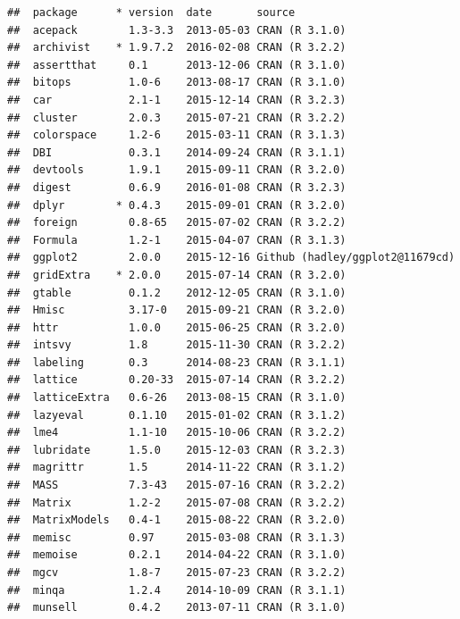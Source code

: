 \documentclass[nojss]{jss}\usepackage[]{graphicx}\usepackage[]{color}
\makeatletter
\newenvironment{kframe}{%
 \def\at@end@of@kframe{}%
 \ifinner\ifhmode%
  \def\at@end@of@kframe{\end{minipage}}%
  \begin{minipage}{\columnwidth}%
 \fi\fi%
 \def\FrameCommand##1{\hskip\@totalleftmargin \hskip-\fboxsep
 \colorbox{shadecolor}{##1}\hskip-\fboxsep
     \hskip-\linewidth \hskip-\@totalleftmargin \hskip\columnwidth}%
 \MakeFramed {\advance\hsize-\width
   \@totalleftmargin\z@ \linewidth\hsize
   \@setminipage}}%
 {\par\unskip\endMakeFramed%
 \at@end@of@kframe}
\newenvironment{knitrout}{}{} %
\makeatother
\begin{document}
\begin{knitrout}
\begin{kframe}
{\ttfamily\noindent\itshape\color{messagecolor}{\#\# Packages -------------------------------------------------------------}}\begin{verbatim}
##  package      * version  date       source                         
##  acepack        1.3-3.3  2013-05-03 CRAN (R 3.1.0)                 
##  archivist    * 1.9.7.2  2016-02-08 CRAN (R 3.2.2)                 
##  assertthat     0.1      2013-12-06 CRAN (R 3.1.0)                 
##  bitops         1.0-6    2013-08-17 CRAN (R 3.1.0)                 
##  car            2.1-1    2015-12-14 CRAN (R 3.2.3)                 
##  cluster        2.0.3    2015-07-21 CRAN (R 3.2.2)                 
##  colorspace     1.2-6    2015-03-11 CRAN (R 3.1.3)                 
##  DBI            0.3.1    2014-09-24 CRAN (R 3.1.1)                 
##  devtools       1.9.1    2015-09-11 CRAN (R 3.2.0)                 
##  digest         0.6.9    2016-01-08 CRAN (R 3.2.3)                 
##  dplyr        * 0.4.3    2015-09-01 CRAN (R 3.2.0)                 
##  foreign        0.8-65   2015-07-02 CRAN (R 3.2.2)                 
##  Formula        1.2-1    2015-04-07 CRAN (R 3.1.3)                 
##  ggplot2        2.0.0    2015-12-16 Github (hadley/ggplot2@11679cd)
##  gridExtra    * 2.0.0    2015-07-14 CRAN (R 3.2.0)                 
##  gtable         0.1.2    2012-12-05 CRAN (R 3.1.0)                 
##  Hmisc          3.17-0   2015-09-21 CRAN (R 3.2.0)                 
##  httr           1.0.0    2015-06-25 CRAN (R 3.2.0)                 
##  intsvy         1.8      2015-11-30 CRAN (R 3.2.2)                 
##  labeling       0.3      2014-08-23 CRAN (R 3.1.1)                 
##  lattice        0.20-33  2015-07-14 CRAN (R 3.2.2)                 
##  latticeExtra   0.6-26   2013-08-15 CRAN (R 3.1.0)                 
##  lazyeval       0.1.10   2015-01-02 CRAN (R 3.1.2)                 
##  lme4           1.1-10   2015-10-06 CRAN (R 3.2.2)                 
##  lubridate      1.5.0    2015-12-03 CRAN (R 3.2.3)                 
##  magrittr       1.5      2014-11-22 CRAN (R 3.1.2)                 
##  MASS           7.3-43   2015-07-16 CRAN (R 3.2.2)                 
##  Matrix         1.2-2    2015-07-08 CRAN (R 3.2.2)                 
##  MatrixModels   0.4-1    2015-08-22 CRAN (R 3.2.0)                 
##  memisc         0.97     2015-03-08 CRAN (R 3.1.3)                 
##  memoise        0.2.1    2014-04-22 CRAN (R 3.1.0)                 
##  mgcv           1.8-7    2015-07-23 CRAN (R 3.2.2)                 
##  minqa          1.2.4    2014-10-09 CRAN (R 3.1.1)                 
##  munsell        0.4.2    2013-07-11 CRAN (R 3.1.0)                 

\end{verbatim}
\end{kframe}
\end{knitrout}
\end{document}
